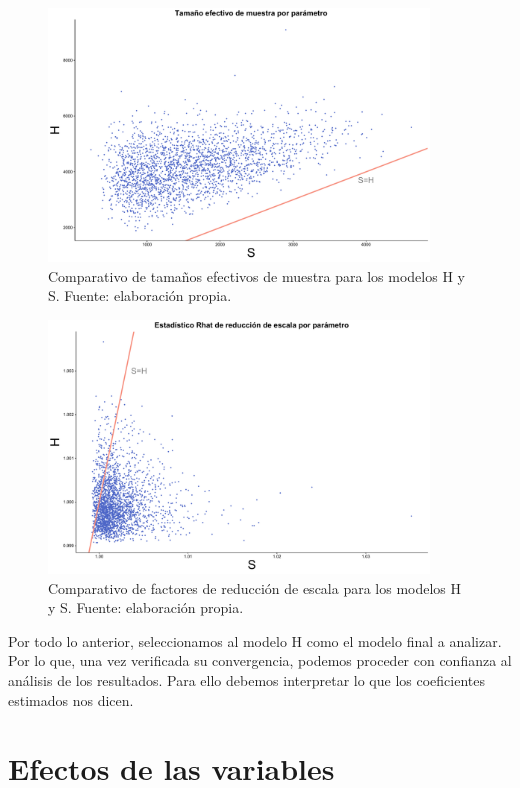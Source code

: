  
\begin{figure}[H]
	\centering
	\includegraphics[width = 0.9\textwidth]{Figs/Convergencia/Compara_n_eff}
	\caption{Comparativo de tamaños efectivos de muestra para los modelos H y S. Fuente: elaboración propia.}
	\label{fig:N_eff_compara}
\end{figure} 

\begin{figure}[H]
	\centering
	\includegraphics[width = 0.9\textwidth]{Figs/Convergencia/Compara_Rhat}
	\caption{Comparativo de factores de reducción de escala para los modelos H y S. Fuente: elaboración propia.}
	\label{fig:Rhat_compara}
\end{figure} 
 
  Por todo lo anterior, seleccionamos al modelo H como el modelo final a analizar. Por lo que, una vez verificada su convergencia, podemos proceder con confianza al análisis de los resultados. Para ello debemos interpretar lo que los coeficientes estimados nos dicen. 
 
\section{Efectos de las variables}

